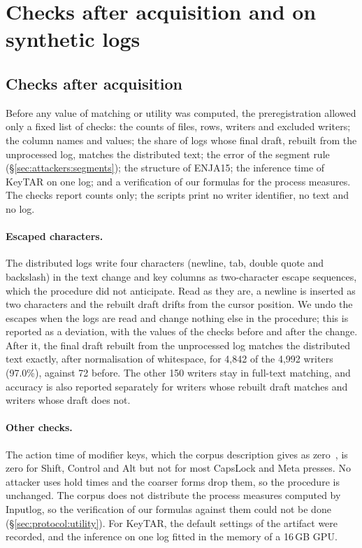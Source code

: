 \section{Checks after acquisition and on synthetic logs}
\label{app:checks}


\subsection{Checks after acquisition}
\label{sec:data:checks}

Before any value of matching or utility was computed, the preregistration allowed only a fixed list of checks: the
counts of files, rows, writers and excluded writers; the column names and values; the share of logs whose final draft,
rebuilt from the unprocessed log, matches the distributed text; the error of the segment rule
(\S\ref{sec:attackers:segments}); the structure of ENJA15; the inference time of KeyTAR on one log; and a verification
of our formulas for the process measures. The checks report counts only; the scripts print no writer identifier, no
text and no log.

\paragraph{Escaped characters.}
The distributed logs write four characters (newline, tab, double quote and backslash) in the text change and key
columns as two-character escape sequences, which the procedure did not anticipate. Read as they are, a newline is
inserted as two characters and the rebuilt draft drifts from the cursor position. We undo the escapes when the logs are
read and change nothing else in the procedure; this is reported as a deviation, with the values of the checks before
and after the change. After it, the final draft rebuilt from the unprocessed log matches the distributed text exactly,
after normalisation of whitespace, for 4,842 of the 4,992 writers (97.0\%), against 72 before. The other 150 writers
stay in full-text matching, and accuracy is also reported separately for writers whose rebuilt draft matches and
writers whose draft does not.

\paragraph{Other checks.}
The action time of modifier keys, which the corpus description gives as zero~\cite{tian2025klicke}, is zero for Shift,
Control and Alt but not for most CapsLock and Meta presses. No attacker uses hold times and the coarser forms drop
them, so the procedure is unchanged. The corpus does not distribute the process measures computed by Inputlog, so the
verification of our formulas against them could not be done (\S\ref{sec:protocol:utility}). For KeyTAR, the default
settings of the artifact were recorded, and the inference on one log fitted in the memory of a 16\,GB GPU.

